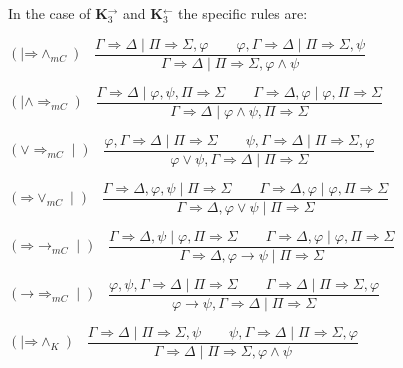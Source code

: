 \documentclass[10pt,a4paper]{article}
\theoremstyle{definition}
\newcommand{\3}{\vspace{.3in}}
\newcommand{\2}{\vspace{.2in}}
\newcommand{\1}{\vspace{.1in}}
\newcommand{\5}{\vspace{.05in}}
\begin{document}
\1


In the case of {\bf K$_3^\rightarrow$} and {\bf K$_3^\leftarrow$} the specific rules are:

\1

\noindent$(\mid \mathord{\Rightarrow}\mathord{\wedge_{mC}})$ \ $\dfrac{\Gamma
	\Rightarrow \Delta \mid \Pi\Rightarrow\Sigma, \varphi \qquad \varphi, \Gamma\Rightarrow\Delta \mid \Pi\Rightarrow\Sigma, \psi}{\Gamma\Rightarrow\Delta \mid \Pi\Rightarrow\Sigma, \varphi\wedge\psi}$ 

\1

\noindent$(\mid \mathord{\wedge}\mathord{\Rightarrow_{mC}})$ \ $\dfrac{\Gamma\Rightarrow \Delta \mid \varphi, \psi, \Pi\Rightarrow\Sigma \qquad \Gamma\Rightarrow\Delta, \varphi \mid \varphi, \Pi\Rightarrow\Sigma}{\Gamma\Rightarrow\Delta \mid \varphi\wedge\psi, \Pi\Rightarrow\Sigma}$ 

\1

\noindent$(\mathord{\vee}\mathord{\Rightarrow_{mC}}\mid)$ \ $\dfrac{\varphi, \Gamma
	\Rightarrow \Delta \mid \Pi\Rightarrow\Sigma \qquad \psi, \Gamma\Rightarrow\Delta \mid \Pi\Rightarrow\Sigma, \varphi}{\varphi\vee\psi, \Gamma\Rightarrow\Delta \mid \Pi\Rightarrow\Sigma}$ 

\1

\noindent$(\mathord{\Rightarrow}\mathord{\vee_{mC}}\mid)$ \ $\dfrac{\Gamma\Rightarrow \Delta, \varphi, \psi \mid \Pi\Rightarrow\Sigma \qquad \Gamma\Rightarrow\Delta, \varphi \mid \varphi, \Pi\Rightarrow\Sigma}{\Gamma\Rightarrow\Delta, \varphi\vee\psi \mid \Pi\Rightarrow\Sigma}$ 

\1

\noindent$(\mathord{\Rightarrow}\mathord{\rightarrow_{mC}}\mid)$ \ $\dfrac{\Gamma
	\Rightarrow \Delta, \psi \mid \varphi, \Pi\Rightarrow\Sigma \qquad \Gamma\Rightarrow\Delta, \varphi \mid \varphi, \Pi\Rightarrow\Sigma}{\Gamma\Rightarrow\Delta, \varphi\rightarrow\psi \mid \Pi\Rightarrow\Sigma}$ 

\1

\noindent$(\mathord{\rightarrow}\mathord{\Rightarrow_{mC}}\mid)$ \ $\dfrac{\varphi, \psi, \Gamma\Rightarrow \Delta \mid \Pi\Rightarrow\Sigma \qquad \Gamma\Rightarrow\Delta \mid \Pi\Rightarrow\Sigma, \varphi}{\varphi\rightarrow\psi, \Gamma\Rightarrow\Delta \mid \Pi\Rightarrow\Sigma}$ 

\1



\noindent$(\mid \mathord{\Rightarrow}\mathord{\wedge_K})$ \ $\dfrac{\Gamma
	\Rightarrow \Delta \mid \Pi\Rightarrow\Sigma, \psi \qquad \psi, \Gamma\Rightarrow\Delta \mid \Pi\Rightarrow\Sigma, \varphi}{\Gamma\Rightarrow\Delta \mid \Pi\Rightarrow\Sigma, \varphi\wedge\psi}$ 
\end{document}
